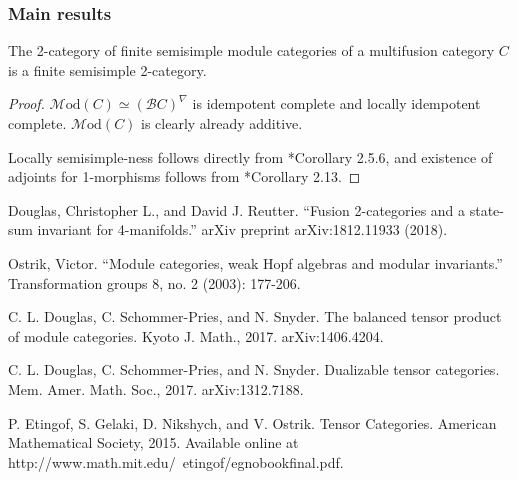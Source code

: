 \documentclass{beamer}
\newcommand{\cB}{{\mathcal{B}}}
\newcommand{\Mod}{{\mathcal{M}\textrm{od}}}
\newcommand{\ModA}[1]{{\Mod(#1)}}
\begin{document}
\begin{frame}
\frametitle{Main results}

\begin{theorem}
The 2-category of finite semisimple module categories
of a multifusion category $C$
is a finite semisimple 2-category.
\end{theorem}

\pause

\begin{proof}
$\ModA{C} \simeq (\cB C)^\nabla$ is idempotent complete
and locally idempotent complete.
$\ModA{C}$ is clearly already additive.


Locally semisimple-ness follows directly from
\cite{DSPSb}*{Corollary 2.5.6},
and existence of adjoints for 1-morphisms
follows from \cite{DSPSa}*{Corollary 2.13}.

\end{proof}

\end{frame}


\begin{frame}

\end{frame}

\begin{frame}
\begin{thebibliography}{1}

 Douglas, Christopher L., and David J. Reutter. ``Fusion
2-categories and a state-sum invariant for 4-manifolds.'' arXiv preprint arXiv:1812.11933 (2018).

 Ostrik, Victor. ``Module categories, weak Hopf algebras and
modular invariants.'' Transformation groups 8, no. 2 (2003): 177-206.

 C. L. Douglas, C. Schommer-Pries, and N. Snyder. The balanced tensor product of module
categories. Kyoto J. Math., 2017. arXiv:1406.4204.

 C. L. Douglas, C. Schommer-Pries, and N. Snyder. Dualizable tensor categories. Mem. Amer.
Math. Soc., 2017. arXiv:1312.7188.

 P. Etingof, S. Gelaki, D. Nikshych, and V. Ostrik. Tensor Categories. American Mathematical
Society, 2015. Available online at http://www.math.mit.edu/~etingof/egnobookfinal.pdf.

\end{thebibliography}
\end{frame}
\end{document}
